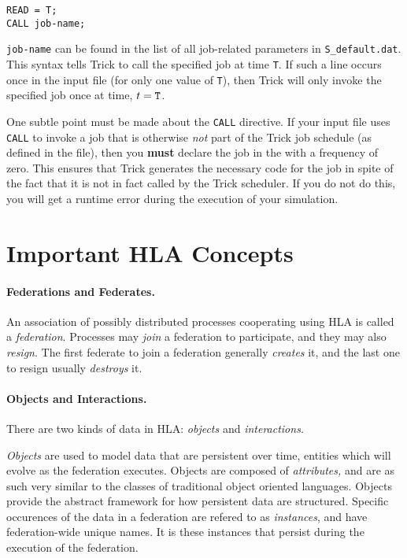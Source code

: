 \begin{verbatim}
READ = T;
CALL job-name;
\end{verbatim}

{\tt job-name} can be found in the list of all job-related
parameters in {\tt S\_default.dat}.
This syntax tells Trick to call the specified job at time {\tt T}.
If such a line occurs once in the input file (for only one value of {\tt T}),
then Trick will only invoke the specified job once at time, $t = {\tt T}$.

One subtle point must be made about the {\tt CALL} directive.
If your input file uses {\tt CALL} to invoke a job that is otherwise
{\em not} part of the Trick job schedule (as defined in the \sdefine file),
then you {\bf must} declare the job in the \sdefine with a frequency of zero.
This ensures that Trick generates the necessary code for the job
in spite of the fact that it is not in fact called by the Trick scheduler.
If you do not do this, you will get a runtime error during the execution
of your simulation.

\section{Important HLA Concepts}

\paragraph{Federations and Federates.}
An association of possibly distributed processes cooperating using HLA
is called a {\em federation}.
Processes may {\em join} a federation to participate,
and they may also {\em resign}.
The first federate to join a federation generally {\em creates} it,
and the last one to resign usually {\em destroys} it.

\paragraph{Objects and Interactions.}
There are two kinds of data in HLA: {\em objects} and {\em interactions.}

{\em Objects} are used to model data that are persistent over time,
entities which will evolve as the federation executes.
Objects are composed of {\em attributes,} and are as such very similar to
the classes of traditional object oriented languages.
Objects provide the abstract framework for how persistent data are structured.
Specific occurences of the data in a federation are refered to as
{\em instances}, and have federation-wide unique names.
It is these instances that persist during the execution of the federation.

